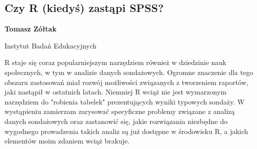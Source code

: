\documentclass[\main/boa.tex]{subfiles}
\begin{document}
\subsection{Czy R (kiedyś) zastąpi SPSS?}

\begin{minipage}{0.915\textwidth}
	\centering
  {\bf {}  Tomasz Zółtak}
\end{minipage}

\vskip 0.3cm

\begin{affiliations}
\begin{minipage}{0.915\textwidth}
\centering
Instytut Badań Edukacyjnych \\[-2pt]
\end{minipage}
\end{affiliations}

\vskip 0.8cm

 R staje się coraz popularniejszym narzędziem również w dziedzinie nauk społecznych, w tym w analizie danych sondażowych. Ogromne znaczenie dla tego obszaru zastosowań miał rozwój możliwości związanych z tworzeniem raportów, jaki nastąpił w ostatnich latach. Niemniej R wciąż nie jest wymarzonym narzędziem do "robienia tabelek" prezentujących wyniki typowych sondaży. W wystąpieniu zamierzam zarysować specyficzne problemy związane z analizą danych sondażowych oraz zastanowić się, jakie rozwiązania niezbędne do wygodnego prowadzenia takich analiz są już dostępne w środowisku R, a jakich elementów moim zdaniem wciąż brakuje. 
\end{document}
